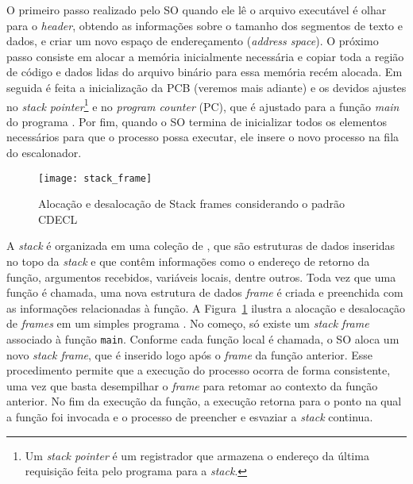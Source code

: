 O primeiro passo realizado pelo SO quando ele lê o arquivo executável é olhar
para o \emph{header}, obtendo as informações sobre o tamanho dos segmentos de
texto e dados, e criar um novo espaço de endereçamento (\emph{address space}).
O próximo passo consiste em alocar a memória inicialmente necessária e copiar
toda a região de código e dados lidas do arquivo binário para essa memória
recém alocada. Em seguida é feita a inicialização da PCB (veremos mais adiante)
e os devidos ajustes no \emph{stack pointer}\footnote{Um \emph{stack pointer} é
um registrador que armazena o endereço da última requisição feita pelo programa
para a \emph{stack}.} e no \emph{program counter} (PC), que é ajustado para a
função \emph{main} do programa \citep{patterson}. Por fim, quando o SO termina
de inicializar todos os elementos necessários para que o processo possa
executar, ele insere o novo processo na fila do escalonador.

\begin{figure}[!h]
  \centering
  \texttt{[image: stack\_frame]}
  \caption{Alocação e desalocação de Stack frames considerando o padrão CDECL~\citep{patterson}}
  \label{fig:stack_frames} 
\end{figure}


A \emph{stack} é organizada em uma coleção de , que
são estruturas de dados inseridas no topo da \emph{stack} e que contêm
informações como o endereço de retorno da função, argumentos recebidos,
variáveis locais, dentre outros. Toda vez que uma função é chamada, uma nova
estrutura de dados \emph{frame} é criada e preenchida com as informações
relacionadas à função.  A Figura~\ref{fig:stack_frames} ilustra a alocação e
desalocação de \textit{frames} em um simples programa \citep{gdb}. No começo,
só existe um \emph{stack frame} associado à função \texttt{main}. Conforme cada
função local é chamada, o SO aloca um novo \emph{stack frame}, que é inserido
logo após o \emph{frame} da função anterior. Esse procedimento permite que a
execução do processo ocorra de forma consistente, uma vez que basta desempilhar
o \emph{frame} para retomar ao contexto da função anterior. No fim da execução
da função, a execução retorna para o ponto na qual a função foi invocada e o
processo de preencher e esvaziar a \emph{stack} continua.

